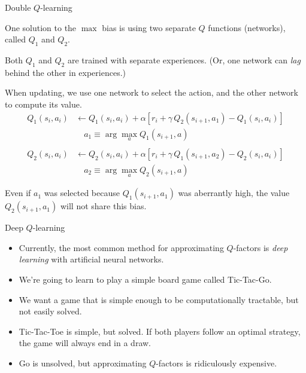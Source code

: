 \documentclass[9pt]{beamer}
\newcommand\pskip{\pause\bigskip}
\newcommand\lspace{\addtolength{\itemsep}{0.5\baselineskip}}
\begin{document}
\begin{frame}{Double $Q$-learning}

One solution to the $\max$ bias is using two separate $Q$ functions (networks), called $Q_1$ and $Q_2$.

\bigskip
Both $Q_1$ and $Q_2$ are trained with separate experiences. (Or, one network can \emph{lag} behind the other in experiences.)

\pskip
When updating, we use one network to select the action, and the other network to compute its value.
\begin{align*}
	Q_1(s_i,a_i) &\leftarrow Q_1(s_i,a_i) + \alpha\left[ r_i + \gamma\, Q_2(s_{i+1},a_1) - Q_1(s_i,a_i) \right] \\
	& \quad a_1 \equiv \arg\max_a Q_1(s_{i+1},a) \\ \\
	Q_2(s_i,a_i) &\leftarrow Q_2(s_i,a_i) + \alpha\left[ r_i + \gamma\, Q_1(s_{i+1},a_2) - Q_2(s_i,a_i) \right] \\
	& \quad a_2 \equiv \arg\max_a Q_2(s_{i+1},a)
\end{align*}

\pskip
Even if $a_1$ was selected because $Q_1(s_{i+1},a_1)$ was aberrantly high, the value $Q_2(s_{i+1},a_1)$ will not share this bias.
	
\end{frame}

\begin{frame}{Deep $Q$-learning}

\begin{itemize}\lspace
	\item Currently, the most common method for approximating $Q$-factors is \emph{deep learning} with artificial neural networks.
	\item We're going to learn to play a simple board game called Tic-Tac-Go.
	\item We want a game that is simple enough to be computationally tractable, but not easily solved.
	\item<2->Tic-Tac-Toe is simple, but solved. If both players follow an optimal strategy, the game will always end in a draw.
	\item<3->Go is unsolved, but approximating $Q$-factors is ridiculously expensive.
\end{itemize}

\end{frame}
\end{document}
